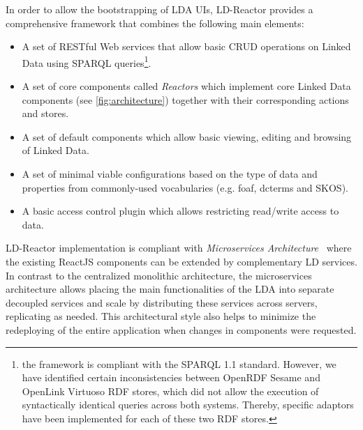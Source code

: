 \documentclass{llncs}
\begin{document}
In order to allow the bootstrapping of LDA UIs, LD-Reactor provides a comprehensive framework that combines the following main elements:
\begin{itemize}
\small
\item A set of RESTful Web services that allow basic CRUD operations on Linked Data using SPARQL queries\footnote{the framework is compliant with the SPARQL 1.1 standard. However, we have identified certain inconsistencies between OpenRDF Sesame and OpenLink Virtuoso RDF stores, which did not allow the execution of syntactically identical queries across both systems. Thereby, specific adaptors have been implemented for each of these two RDF stores.}.

\item A set of core components called \emph{Reactors} which implement core Linked Data components (see \autoref{fig:architecture}) together with their corresponding actions and stores.

\item A set of default components which allow basic viewing, editing and browsing of Linked Data.

\item A set of minimal viable configurations based on the type of data and properties from commonly-used vocabularies (e.g. foaf, dcterms and SKOS).

\item A basic access control plugin which allows restricting read/write access to data.

\end{itemize}

%

LD-Reactor implementation is compliant with \emph{Microservices Architecture}~\cite{microservices} where the existing ReactJS components can be extended by complementary LD services.
In contrast to the centralized monolithic architecture, the microservices architecture allows placing the main functionalities of the LDA into separate decoupled services and scale by distributing these services across servers, replicating as needed.
This architectural style also helps to minimize the redeploying of the entire application when changes in components were requested.

\end{document}

